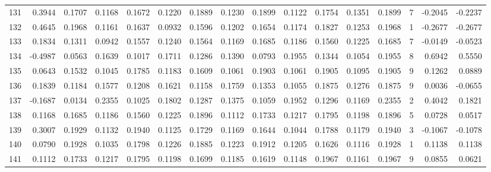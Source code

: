 \begin{tabular}{lrrrrrrrrrrrrrrr}
131 &      0.3944 &  0.1707 &  0.1168 &  0.1672 &  0.1220 &  0.1889 &  0.1230 &  0.1899 &  0.1122 &  0.1754 &   0.1351 &     0.1899 &      7 &                   -0.2045 &                    -0.2237 \\
132 &      0.4645 &  0.1968 &  0.1161 &  0.1637 &  0.0932 &  0.1596 &  0.1202 &  0.1654 &  0.1174 &  0.1827 &   0.1253 &     0.1968 &      1 &                   -0.2677 &                    -0.2677 \\
133 &      0.1834 &  0.1311 &  0.0942 &  0.1557 &  0.1240 &  0.1564 &  0.1169 &  0.1685 &  0.1186 &  0.1560 &   0.1225 &     0.1685 &      7 &                   -0.0149 &                    -0.0523 \\
134 &     -0.4987 &  0.0563 &  0.1639 &  0.1017 &  0.1711 &  0.1286 &  0.1390 &  0.0793 &  0.1955 &  0.1344 &   0.1054 &     0.1955 &      8 &                    0.6942 &                     0.5550 \\
135 &      0.0643 &  0.1532 &  0.1045 &  0.1785 &  0.1183 &  0.1609 &  0.1061 &  0.1903 &  0.1061 &  0.1905 &   0.1095 &     0.1905 &      9 &                    0.1262 &                     0.0889 \\
136 &      0.1839 &  0.1184 &  0.1577 &  0.1208 &  0.1621 &  0.1158 &  0.1759 &  0.1353 &  0.1055 &  0.1875 &   0.1276 &     0.1875 &      9 &                    0.0036 &                    -0.0655 \\
137 &     -0.1687 &  0.0134 &  0.2355 &  0.1025 &  0.1802 &  0.1287 &  0.1375 &  0.1059 &  0.1952 &  0.1296 &   0.1169 &     0.2355 &      2 &                    0.4042 &                     0.1821 \\
138 &      0.1168 &  0.1685 &  0.1186 &  0.1560 &  0.1225 &  0.1896 &  0.1112 &  0.1733 &  0.1217 &  0.1795 &   0.1198 &     0.1896 &      5 &                    0.0728 &                     0.0517 \\
139 &      0.3007 &  0.1929 &  0.1132 &  0.1940 &  0.1125 &  0.1729 &  0.1169 &  0.1644 &  0.1044 &  0.1788 &   0.1179 &     0.1940 &      3 &                   -0.1067 &                    -0.1078 \\
140 &      0.0790 &  0.1928 &  0.1035 &  0.1798 &  0.1226 &  0.1885 &  0.1223 &  0.1912 &  0.1205 &  0.1626 &   0.1116 &     0.1928 &      1 &                    0.1138 &                     0.1138 \\
141 &      0.1112 &  0.1733 &  0.1217 &  0.1795 &  0.1198 &  0.1699 &  0.1185 &  0.1619 &  0.1148 &  0.1967 &   0.1161 &     0.1967 &      9 &                    0.0855 &                     0.0621 \\

\end{tabular}

